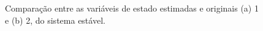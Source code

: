 \begin{figure}[H]
\begin{center}
\end{center}
\caption{Comparação entre as variáveis de estado estimadas e originais (a) 1 e (b) 2, do sistema estável.}
\label{obs:est:x} 
\end{figure}

